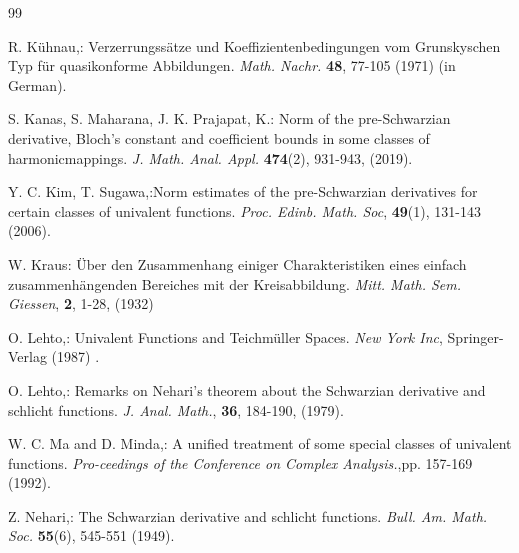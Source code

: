 \documentclass[a4paper,12pt]{amsart}
\theoremstyle{plain}
\theoremstyle{definition}
\theoremstyle{plain}
\begin{document}
\begin{thebibliography}{99}

 {\sc R. Kühnau},: Verzerrungssätze und Koeffizientenbedingungen vom Grunskyschen Typ für quasikonforme
Abbildungen. \textit{Math. Nachr.} \textbf{48}, 77-105 (1971) (in German).

 {\sc S. Kanas}, {\sc S. Maharana}, {\sc J. K. Prajapat}, K.: Norm of the pre-Schwarzian derivative, Bloch’s constant and coefficient bounds in some classes of harmonicmappings.  \textit{J. Math. Anal. Appl.} \textbf{474}(2), 931-943, (2019). 

 {\sc Y. C. Kim}, {\sc  T. Sugawa},:Norm estimates of the pre-Schwarzian derivatives for certain classes of univalent functions. \textit{Proc. Edinb. Math. Soc}, \textbf{49}(1), 131-143 (2006).



 {\sc W. Kraus}: Über den Zusammenhang einiger Charakteristiken eines einfach zusammenhängenden Bereiches mit der Kreisabbildung.  \textit{Mitt. Math. Sem. Giessen}, \textbf{2}, 1-28, (1932)

 {\sc O. Lehto},: Univalent Functions and Teichmüller Spaces.  \textit{New York Inc}, Springer-Verlag (1987) .

 {\sc O. Lehto},: Remarks on Nehari’s theorem about the Schwarzian derivative and schlicht functions. \textit{J. Anal. Math.}, \textbf{36}, 184-190, (1979).

 {\sc W. C. Ma} and  {\sc D. Minda},: A unified treatment of some special classes of univalent functions. \textit{ Pro-ceedings of the Conference on Complex Analysis.},pp. 157-169 (1992).


 {\sc Z. Nehari},: The Schwarzian derivative and schlicht functions. \textit{Bull. Am. Math. Soc.} \textbf{55}(6), 545-551 (1949).




\end{thebibliography}
\end{document}

